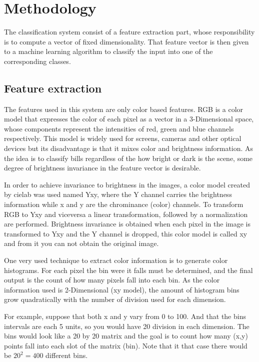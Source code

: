 \documentclass{IEEEtran}
\begin{document}
\section{Methodology}

The classification system consist of a feature extraction part, whose responsibility is to compute a vector of
fixed dimensionality. That feature vector is then given to a machine learning algorithm to classify the input
into one of the corresponding classes.

\subsection{Feature extraction}

The features used in this system are only color based features. RGB is a color model that expresses the color of
each pixel as a vector in a 3-Dimensional space, whose components represent the intensities of red, green and blue
channels respectively. This model is widely used for screens, cameras and other optical devices but its disadvantage is 
that it mixes color and brightness information. As the idea is to classify bills regardless of the how bright or 
dark is the scene, some degree of brightness invariance in the feature vector is desirable.

In order to achieve invariance to brightness in the images, a color model created by cielab was used %
named Yxy, where the Y channel carries the brightness information while x and y are the chrominance (color) 
channels. To transform RGB to Yxy and viceversa a linear transformation, followed by a normalization are
performed. Brightness invariance is obtained when each pixel in the image is transformed to Yxy and the
Y channel is dropped, this color model is called xy and from it you can not obtain the original image.

One very used technique to extract color information is to generate color histograms. For each pixel
the bin were it falls must be determined, and the final output is the count of how many pixels fall
into each bin. As the color information used is 2-Dimensional (xy model), the amount of histogram
bins grow quadratically with the number of division used for each dimension. 

For example, suppose that both x and y vary from 0 to 100. And that the bins intervals are each 5
units, so you would have 20 division in each dimension. The bins would look like a 20 by 20 matrix
and the goal is to count how many (x,y) points fall into each slot of the matrix (bin). Note that
it that case there would be $20^2=400$ different bins.
\end{document}
